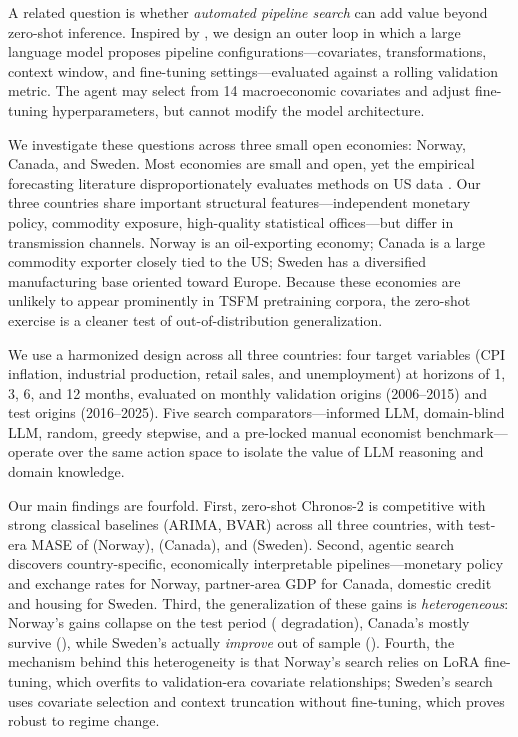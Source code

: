 \documentclass[12pt,a4paper]{article}
\begin{document}
A related question is whether \emph{automated pipeline search} can add value beyond zero-shot inference. Inspired by \citet{karpathy2026autoresearch}, we design an outer loop in which a large language model proposes pipeline configurations---covariates, transformations, context window, and fine-tuning settings---evaluated against a rolling validation metric. The agent may select from 14 macroeconomic covariates and adjust fine-tuning hyperparameters, but cannot modify the model architecture.

We investigate these questions across three small open economies: Norway, Canada, and Sweden. Most economies are small and open, yet the empirical forecasting literature disproportionately evaluates methods on US data \citep{stock2002macroeconomic}. Our three countries share important structural features---independent monetary policy, commodity exposure, high-quality statistical offices---but differ in transmission channels. Norway is an oil-exporting economy; Canada is a large commodity exporter closely tied to the US; Sweden has a diversified manufacturing base oriented toward Europe. Because these economies are unlikely to appear prominently in TSFM pretraining corpora, the zero-shot exercise is a cleaner test of out-of-distribution generalization.

We use a harmonized design across all three countries: four target variables (CPI inflation, industrial production, retail sales, and unemployment) at horizons of 1, 3, 6, and 12 months, evaluated on \nValOrigins{} monthly validation origins (2006--2015) and \nTestOrigins{} test origins (2016--2025). Five search comparators---informed LLM, domain-blind LLM, random, greedy stepwise, and a pre-locked manual economist benchmark---operate over the same action space to isolate the value of LLM reasoning and domain knowledge.

Our main findings are fourfold. First, zero-shot Chronos-2 is competitive with strong classical baselines (ARIMA, BVAR) across all three countries, with test-era MASE of \norZsTest{} (Norway), \canZsTest{} (Canada), and \sweZsTest{} (Sweden). Second, agentic search discovers country-specific, economically interpretable pipelines---monetary policy and exchange rates for Norway, partner-area GDP for Canada, domestic credit and housing for Sweden. Third, the generalization of these gains is \emph{heterogeneous}: Norway's gains collapse on the test period (\norTestGapPct{} degradation), Canada's mostly survive (\canTestGapPct{}), while Sweden's actually \emph{improve} out of sample (\sweTestGapPct{}). Fourth, the mechanism behind this heterogeneity is that Norway's search relies on LoRA fine-tuning, which overfits to validation-era covariate relationships; Sweden's search uses covariate selection and context truncation without fine-tuning, which proves robust to regime change.
\end{document}
